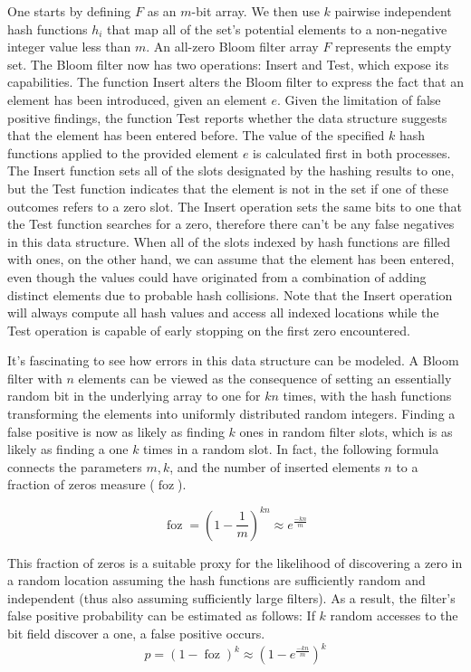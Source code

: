 \documentclass[sigconf, nonacm]{acmart}
\DeclareMathOperator{\foz}{foz}
\begin{document}
One starts by defining $F$ as an $m$-bit array. We then use $k$ pairwise independent hash functions $h_i$ that map all of the set's potential elements to a non-negative integer value less than $m$. An all-zero Bloom filter array $F$ represents the empty set. The Bloom filter now has two operations: Insert and Test, which expose its capabilities. The function Insert alters the Bloom filter to express the fact that an element has been introduced, given an element $e$. Given the limitation of false positive findings, the function Test reports whether the data structure suggests that the element has been entered before. The value of the specified $k$ hash functions applied to the provided element $e$ is calculated first in both processes. The Insert function sets all of the slots designated by the hashing results to one, but the Test function indicates that the element is not in the set if one of these outcomes refers to a zero slot. The Insert operation sets the same bits to one that the Test function searches for a zero, therefore there can't be any false negatives in this data structure. When all of the slots indexed by hash functions are filled with ones, on the other hand, we can assume that the element has been entered, even though the values could have originated from a combination of adding distinct elements due to probable hash collisions. Note that the Insert operation will always compute all hash values and access all indexed locations while the Test operation is capable of early stopping on the first zero encountered.

It's fascinating to see how errors in this data structure can be modeled. A Bloom filter with $n$ elements can be viewed as the consequence of setting an essentially random bit in the underlying array to one for $kn$ times, with the hash functions transforming the elements into uniformly distributed random integers.
Finding a false positive is now as likely as finding $k$ ones in random filter slots, which is as likely as finding a one $k$ times in a random slot.
In fact, the following formula connects the parameters $m, k$, and the number of inserted elements $n$ to a fraction of zeros measure ($\foz$).

\begin{equation}
  \foz = \left(1- \frac{1}{m} \right) ^{k n} \approx e^{\frac{-k n}{m}}
\end{equation}

This fraction of zeros is a suitable proxy for the likelihood of discovering a zero in a random location assuming the hash functions are sufficiently random and independent (thus also assuming sufficiently large filters). As a result, the filter's false positive probability can be estimated as follows: If $k$ random accesses to the bit field discover a one, a false positive occurs.
\begin{equation}
  p = (1-\foz)^k \approx \left(1-  e^{\frac{-k n}{m}} \right)^k
\end{equation}
\end{document}

